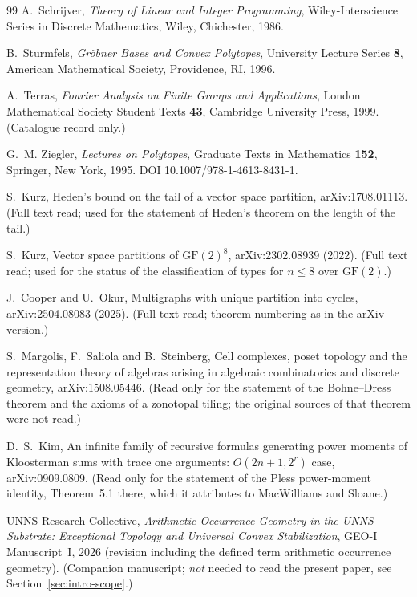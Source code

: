 \begin{thebibliography}{99}
A.~Schrijver, \emph{Theory of Linear and Integer Programming}, Wiley-Interscience Series in Discrete Mathematics, Wiley, Chichester, 1986.

B.~Sturmfels, \emph{Gr\"obner Bases and Convex Polytopes}, University Lecture Series \textbf{8}, American Mathematical Society, Providence, RI, 1996.

A.~Terras, \emph{Fourier Analysis on Finite Groups and Applications}, London Mathematical Society Student Texts \textbf{43}, Cambridge University Press, 1999. (Catalogue record only.)

G.~M. Ziegler, \emph{Lectures on Polytopes}, Graduate Texts in Mathematics \textbf{152}, Springer, New York, 1995. DOI 10.1007/978-1-4613-8431-1.

S.~Kurz, Heden's bound on the tail of a vector space partition, arXiv:1708.01113. (Full text read; used for the statement of Heden's theorem on the length of the tail.)

S.~Kurz, Vector space partitions of $\mathrm{GF}(2)^8$, arXiv:2302.08939 (2022). (Full text read; used for the status of the classification of types for $n\le8$ over $\mathrm{GF}(2)$.)

J.~Cooper and U.~Okur, Multigraphs with unique partition into cycles, arXiv:2504.08083 (2025). (Full text read; theorem numbering as in the arXiv version.)

S.~Margolis, F.~Saliola and B.~Steinberg, Cell complexes, poset topology and the representation theory of algebras arising in algebraic combinatorics and discrete geometry, arXiv:1508.05446. (Read only for the statement of the Bohne--Dress theorem and the axioms of a zonotopal tiling; the original sources of that theorem were not read.)

D.~S.~Kim, An infinite family of recursive formulas generating power moments of Kloosterman sums with trace one arguments: $O(2n+1,2^r)$ case, arXiv:0909.0809. (Read only for the statement of the Pless power-moment identity, Theorem~5.1 there, which it attributes to MacWilliams and Sloane.)

UNNS Research Collective, \emph{Arithmetic Occurrence Geometry in the UNNS Substrate: Exceptional Topology and Universal Convex Stabilization}, GEO-I Manuscript~I, 2026 (revision including the defined term arithmetic occurrence geometry). (Companion manuscript; \emph{not} needed to read the present paper, see Section~\ref{sec:intro-scope}.)


\end{thebibliography}
